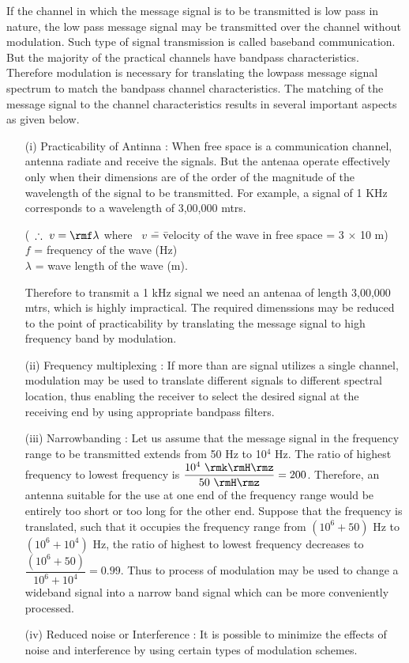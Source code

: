 If the channel in which the message signal is to be transmitted is low
pass in nature, the low pass message signal may be transmitted over
the channel without modulation. Such type of signal transmission is
called baseband communication. But the majority of the practical
channels have bandpass characteristics. Therefore modulation is
necessary for translating the lowpass message signal spectrum to match
the bandpass channel characteristics. The matching of the message
signal to the channel characteristics results in several important
aspects as given below.
\begin{itemize}
\item[(i)] Practicability of Antinna : When free space is a
communication channel, antenna radiate and receive the signals. But
the antenaa operate effectively only when their dimensions are of the
order of the magnitude of the wavelength of the signal to be
transmitted. For example, a signal of 1 KHz corresponds to a
wavelength of 3,00,000 mtrs.      
\begin{tabbing}
(~$\therefore ~v = {\rmf} \lambda$ where ~$v$ \= = \= velocity of the
wave in free space = 3 $\times$ 10 m)\\[4pt]
\hspace{2.67cm} $f$ \> = \>  frequency of the wave (Hz)\\[4pt]
\hspace{2.77cm}$\lambda$ \> = \> wave length of the wave (m).
\end{tabbing}

Therefore to transmit a 1 kHz signal we need an antenaa of length
3,00,000 mtrs, which is highly impractical. The required dimenssions
may be reduced to the point  of practicability by translating the
message signal to high frequency band by modulation.

\item[(ii)] Frequency multiplexing : If more than are signal utilizes
a single channel, modulation may be used to translate different
signals to different spectral location, thus enabling the receiver to
select the desired signal at the receiving  end by using appropriate
bandpass filters.

\item[(iii)] Narrowbanding : Let us assume that the message signal in
the frequency range to be transmitted extends from 50 Hz to 10$^4$
Hz. The ratio of highest frequency to lowest frequency is
$\dfrac{10^4 ~\rmk \rmH \rmz}{50 ~\rmH \rmz} = 200$. Therefore, an
antenna suitable for the use at one end of the frequency range would
be entirely too short or too long for the other end. Suppose that the
frequency is translated, such that it occupies the frequency range
from $(10^6 + 50)$ Hz to $(10^6 + 10^4)$ Hz, the ratio of highest to
lowest frequency decreases to $\dfrac{(10^6+ 50)}{10^6+ 10^4} =
0.99$. Thus to process of modulation may be used to change a wideband
signal into a narrow band signal which can be more conveniently
processed. 

\item[(iv)] Reduced noise or Interference : It is possible to minimize
the effects of noise and interference by using certain types of
modulation schemes. 
\end{itemize}

